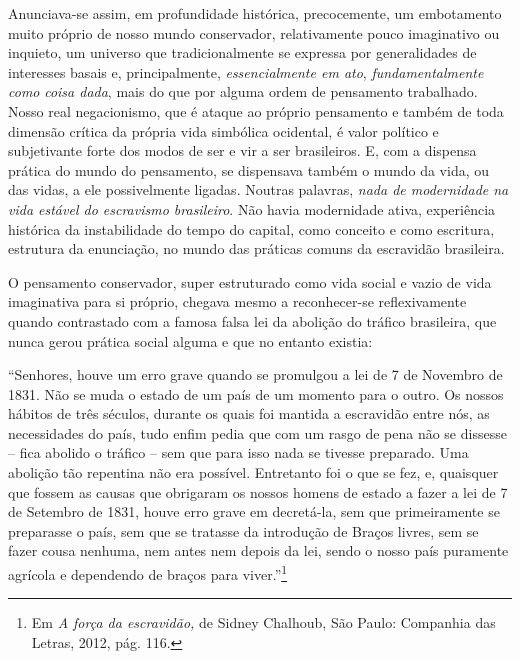 Anunciava-se assim, em profundidade histórica, precocemente, um
embotamento muito próprio de nosso mundo conservador, relativamente
pouco imaginativo ou inquieto, um universo que tradicionalmente se
expressa por generalidades de interesses basais e, principalmente,
\emph{essencialmente em ato}, \emph{fundamentalmente} \emph{como}
\emph{coisa dada}, mais do que por alguma ordem de pensamento
trabalhado. Nosso real negacionismo, que é ataque ao próprio pensamento
e também de toda dimensão crítica da própria vida simbólica ocidental, é
valor político e subjetivante forte dos modos de ser e vir a ser
brasileiros. E, com a dispensa prática do mundo do pensamento, se
dispensava também o mundo da vida, ou das vidas, a ele possivelmente
ligadas. Noutras palavras, \emph{nada de modernidade na vida estável do
escravismo brasileiro}. Não havia modernidade ativa, experiência
histórica da instabilidade do tempo do capital, como conceito e como
escritura, estrutura da enunciação, no mundo das práticas comuns da
escravidão brasileira.

O pensamento conservador, super estruturado como vida social e vazio de
vida imaginativa para si próprio, chegava mesmo a reconhecer-se
reflexivamente quando contrastado com a famosa falsa lei da abolição do
tráfico brasileira, que nunca gerou prática social alguma e que no
entanto existia:

``Senhores, houve um erro grave quando se promulgou a lei de 7 de
Novembro de 1831. Não se muda o estado de um país de um momento para o
outro. Os nossos hábitos de três séculos, durante os quais foi mantida a
escravidão entre nós, as necessidades do país, tudo enfim pedia que com
um rasgo de pena não se dissesse -- fica abolido o tráfico -- sem que
para isso nada se tivesse preparado. Uma abolição tão repentina não era
possível. Entretanto foi o que se fez, e, quaisquer que fossem as causas
que obrigaram os nossos homens de estado a fazer a lei de 7 de Setembro
de 1831, houve erro grave em decretá-la, sem que primeiramente se
preparasse o país, sem que se tratasse da introdução de Braços livres,
sem se fazer cousa nenhuma, nem antes nem depois da lei, sendo o nosso
país puramente agrícola e dependendo de braços para viver.''\footnote{Em
  \emph{A força da escravidão,} de Sidney Chalhoub, São Paulo: Companhia
  das Letras, 2012, pág. 116.}

